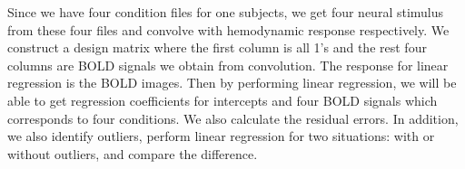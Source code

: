 \par \indent Since we have four condition files for one subjects, we get four
neural stimulus from these four files and convolve with hemodynamic response
respectively. We construct a design matrix where the first column is all 1's
and the rest four columns are BOLD signals we obtain from convolution. The
response for linear regression is the BOLD images. Then by performing linear
regression, we will be able to get regression coefficients for intercepts
and four BOLD signals which corresponds to four conditions. We also calculate
the residual errors. In addition, we also identify outliers, perform linear
regression for two situations: with or without outliers, and compare the
difference.
